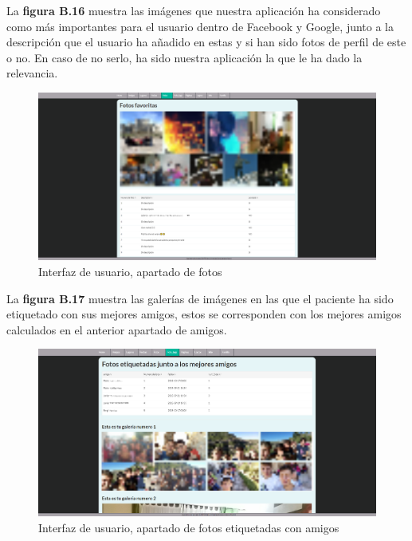 La \textbf{figura B.16} muestra las imágenes que nuestra aplicación ha considerado como más importantes para el usuario dentro de Facebook y Google, junto a la descripción que el usuario ha añadido en estas y si han sido fotos de perfil de este o no. En caso de no serlo, ha sido nuestra aplicación la que le ha dado la relevancia.

\begin{figure}
	\begin{center}
		\includegraphics[scale=0.3]{Imagenes/Fuentes/InterfazFotos.png} \caption{Interfaz de usuario, apartado de fotos}
		\label{WebAplication6}
	\end{center}
\end{figure}

La \textbf{figura B.17} muestra las galerías de imágenes en las que el paciente ha sido etiquetado con sus mejores amigos, estos se corresponden con los mejores amigos calculados en el anterior apartado de amigos.

\begin{figure}
	\begin{center}
		\includegraphics[scale=0.3]{Imagenes/Fuentes/InterfazFoto_tag.png} \caption{Interfaz de usuario, apartado de fotos etiquetadas con amigos}
		\label{WebAplication7}
	\end{center}
\end{figure}

